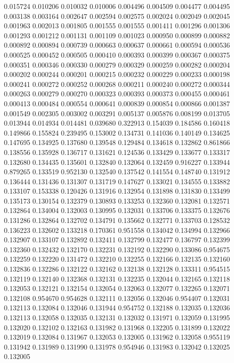 0.015724
0.010206
0.010032
0.010006
0.004496
0.004509
0.004477
0.004495
0.003138
0.003164
0.002647
0.002594
0.002575
0.002024
0.002049
0.002045
0.001963
0.002013
0.001805
0.001555
0.001555
0.001411
0.001296
0.001306
0.001293
0.001212
0.001131
0.001109
0.001023
0.000950
0.000899
0.000882
0.000892
0.000894
0.000739
0.000663
0.000637
0.000661
0.000594
0.000536
0.000525
0.000452
0.000505
0.000410
0.000393
0.000399
0.000367
0.000375
0.000351
0.000346
0.000330
0.000279
0.000329
0.000259
0.000282
0.000204
0.000202
0.000244
0.000201
0.000215
0.000232
0.000229
0.000233
0.000198
0.000241
0.000272
0.000252
0.000268
0.000211
0.000240
0.000272
0.000344
0.000263
0.000279
0.000270
0.000323
0.000393
0.000373
0.000455
0.000461
0.000413
0.000484
0.000554
0.000641
0.000839
0.000854
0.000866
0.001387
0.001549
0.002305
0.003002
0.003291
0.005137
0.005876
0.008199
0.013705
0.013944
0.014934
0.014481
0.039680
0.322913
0.154039
0.184586
0.160418
0.149866
0.155824
0.239495
0.153002
0.134731
0.141036
0.140149
0.134625
0.147695
0.134925
0.137680
0.139548
0.129484
0.134618
0.132862
0.861866
0.138556
0.135928
0.136717
0.131621
0.124536
0.133429
0.133677
0.133317
0.132680
0.134435
0.135601
0.132840
0.132064
0.132459
0.916227
0.133944
0.879265
0.133519
0.952130
0.132540
0.137542
0.141554
0.148740
0.131912
0.136444
0.131436
0.131307
0.131719
0.147627
0.133021
0.134555
0.133882
0.133107
0.153338
0.120426
0.131916
0.132954
0.131898
0.131830
0.133499
0.135173
0.130154
0.132379
0.130893
0.133253
0.132360
0.132081
0.132571
0.132864
0.134004
0.132003
0.130995
0.132031
0.133706
0.133375
0.132676
0.131286
0.132864
0.132702
0.134791
0.135662
0.132771
0.133703
0.128532
0.136223
0.132602
0.133218
0.170361
0.951558
0.134042
0.134994
0.132966
0.132907
0.133107
0.132892
0.132411
0.132799
0.132477
0.136797
0.132399
0.132360
0.132432
0.132170
0.132231
0.132192
0.132290
0.133086
0.954675
0.132259
0.132220
0.131472
0.132210
0.132255
0.132166
0.132135
0.132160
0.132836
0.132286
0.132122
0.132162
0.132138
0.132128
0.133311
0.954515
0.132119
0.132140
0.132368
0.132131
0.132235
0.132044
0.132165
0.132118
0.132053
0.132121
0.132154
0.132054
0.132063
0.132077
0.132265
0.132071
0.132108
0.954670
0.954628
0.132111
0.132056
0.132046
0.954407
0.132031
0.132113
0.132084
0.132046
0.131944
0.954752
0.132188
0.132035
0.132036
0.132113
0.132058
0.132035
0.132131
0.132032
0.131971
0.132059
0.131995
0.132020
0.132102
0.132163
0.131982
0.131968
0.132205
0.131899
0.132022
0.132019
0.132084
0.131967
0.132053
0.132005
0.131962
0.132058
0.955119
0.131942
0.131989
0.131990
0.131978
0.954946
0.131983
0.132042
0.132025
0.132005
